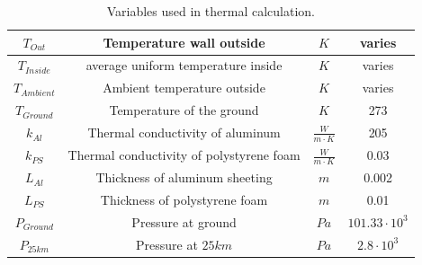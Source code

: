 \begin{table}[H]
\begin{tabular}{|c|c|c|c|}
        $T_{Out}$ & Temperature wall outside & $K$ & varies \\ \hline
        $T_{Inside}$ & average uniform temperature inside & $K$ & varies \\ \hline
        $T_{Ambient}$ & Ambient temperature outside & $K$ & varies \\ \hline
        $T_{Ground}$ & Temperature of the ground & $K$ & 273 \\ \hline
        $k_{Al}$ & Thermal conductivity of aluminum & $\frac{W}{m\cdot K}$ & 205 \\ \hline
        $k_{PS}$ & Thermal conductivity of polystyrene foam & $\frac{W}{m\cdot K}$ & 0.03 \\ \hline
        $L_{Al}$ & Thickness of aluminum sheeting & $m$ & 0.002 \\ \hline
        $L_{PS}$ & Thickness of polystyrene foam & $m$ & 0.01 \\ \hline
        $P_{Ground}$ & Pressure at ground & $Pa$ & $101.33 \cdot 10^3$ \\ \hline
        $P_{25km}$ & Pressure at $25km$ & $Pa$ & $2.8 \cdot 10^3$ \\ \hline
    \end{tabular}
    \caption{Variables used in thermal calculation.}
    \label{tab:thermal-variables}
\end{table}



